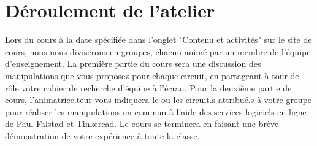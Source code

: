 \documentclass[canadien,12pt,oneside,letterpaper]{article}
\begin{document}
\section{Déroulement de l’atelier}

Lors du cours à la date spécifiée dans l’onglet "Contenu et activités" sur le site de cours, nous nous diviserons en groupes, chacun animé par un membre de l’équipe d’enseignement. La première partie du cours sera une discussion des manipulations que vous proposez pour chaque circuit, en partageant à tour de rôle votre cahier de recherche d’équipe à l’écran. Pour la deuxième partie de cours, l’animatrice.teur vous indiquera le ou les circuit.s attribué.s à votre groupe pour réaliser les manipulations en commun à l’aide des services logiciels en ligne de Paul Falstad et Tinkercad. Le cours se terminera en faisant une brève démonstration de votre expérience à toute la classe.

\end{document}
